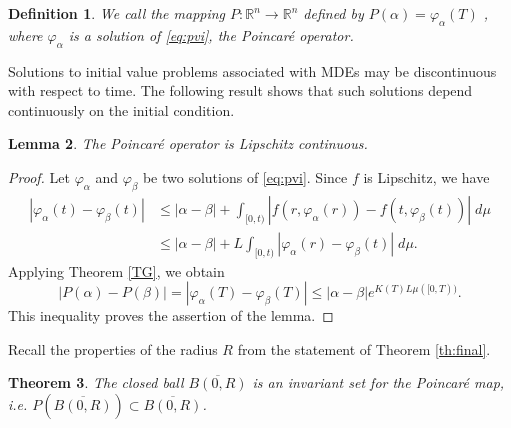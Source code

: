\documentclass[a4paper,11pt]{amsart}
\theoremstyle{plain}
\newtheorem{thm}{Theorem}[section]
\newtheorem{lem}[thm]{Lemma}
\newtheorem{defi}[thm]{Definition}
\theoremstyle{remark}
\newcommand{\rr}{\mathbb{R}}
\numberwithin{equation}{section}
\begin{document}
\begin{defi} \label{def:op-poincare}
We call the mapping $P:\rr^n\to \rr^n$ defined by $P(\alpha)=\varphi_\alpha(T)$ , where $\varphi_\alpha$ is a solution of \eqref{eq:pvi}, the \emph{Poincaré operator}.
\end{defi}

Solutions to initial value problems associated with MDEs may be discontinuous with respect to time. The following result shows that such solutions depend continuously on the initial condition.

\begin{lem}
   The Poincaré operator is Lipschitz continuous.\label{opr continuo}
\end{lem}

\begin{proof}
Let $\varphi_\alpha$ and $\varphi_\beta$ be two solutions of \eqref{eq:pvi}. Since $f$ is Lipschitz, we have
\begin{equation*}
\begin{split}
 	| \varphi_\alpha(t)-\varphi_\beta(t)|&\leq |\alpha-\beta |+\int_{[0,t)} |f(r,\varphi_\alpha(r)) -f(t,\varphi_\beta(t))| \; d\mu\\
	&\leq |\alpha-\beta|+L\int_{[0,t)} |\varphi_\alpha(r) -\varphi_\beta(t)| \; d\mu.
\end{split}
\end{equation*}
Applying Theorem \ref{TG}, we obtain
\begin{equation*}
|P(\alpha)-P(\beta)|=|\varphi_\alpha(T)-\varphi_\beta(T)|\leq  |\alpha-\beta|e^{K(T)L\mu([0,T))}.
\end{equation*}
This inequality proves the assertion of the lemma.
\end{proof}

Recall the properties of the radius $R$ from the statement of Theorem \eqref{th:final}.

 \begin{thm} \label{th: P} The closed ball $ \overline{B(0,R)}$ is an invariant set for the Poincaré map, i.e.  
 $P\left(  \overline{B(0,R)}\right)  \subset \overline{B(0,R)}$.
 \end{thm}
\end{document}
